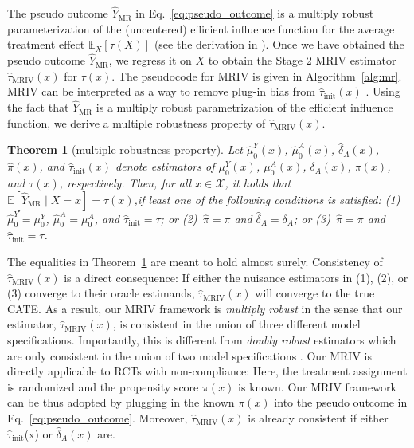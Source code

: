\documentclass{article} %
\newcommand{\E}{\mathbb{E}}
\newcommand{\frameworkname}{MRIV\xspace}
\theoremstyle{definition}
\theoremstyle{plain}
\newtheorem{theorem}{Theorem}
\begin{document}
The pseudo outcome $\hat{Y}_{\mathrm{\mathrm{MR}}}$ in Eq.~\eqref{eq:pseudo_outcome} is a multiply robust parameterization of the (uncentered) efficient influence function for the average treatment effect $\E_X[\tau(X)]$ (see the derivation in \citep{Wang.2018}). %
Once we have obtained the pseudo outcome $\hat{Y}_{\mathrm{\mathrm{MR}}}$, we regress it on $X$ to obtain the Stage 2 \frameworkname estimator $\hat{\tau}_{\mathrm{\frameworkname}}(x)$ for $\tau(x)$. The pseudocode for \frameworkname is given in Algorithm~\ref{alg:mr}. \frameworkname can be interpreted as a way to remove plug-in bias from $\hat{\tau}_{\mathrm{init}}(x)$ \citep{Curth.2020}. Using the fact that $\hat{Y}_{\mathrm{\mathrm{MR}}}$ is a multiply robust parametrization of the efficient influence function, we derive a multiple robustness property of $\hat{\tau}_{\mathrm{MRIV}}(x)$.

\begin{theorem}[multiple robustness property]\label{thrm:robustness}
Let $\hat{\mu}_0^Y(x)$, $\hat{\mu}_0^A(x)$, $\hat{\delta}_A(x)$, $\hat{\pi}(x)$, and $\hat{\tau}_{\mathrm{init}}(x)$ denote estimators of $\mu_0^Y(x)$, $\mu_0^A(x)$, $\delta_A(x)$, $\pi(x)$, and $\tau(x)$, respectively. Then, for all $x \in \mathcal{X}$, it holds that $\E[\hat{Y}_{\mathrm{\mathrm{MR}}} \mid X = x] = \tau(x)$,if least one of the following conditions is satisfied: (1)~$\hat{\mu}_0^Y = \mu_0^Y$, $\hat{\mu}_0^A = \mu_0^A$, and $\hat{\tau}_{\mathrm{init}} = \tau$; or (2)~$\hat{\pi} = \pi$ and $\hat{\delta}_A = \delta_A$; or (3)~$\hat{\pi} = \pi$ and $\hat{\tau}_{\mathrm{init}} = \tau$.
\vspace{-0.2cm}
\end{theorem}
The equalities in Theorem~\ref{thrm:robustness} are meant to hold almost surely. Consistency of $\hat{\tau}_{\mathrm{MRIV}}(x)$ is a direct consequence: If either the nuisance estimators in (1), (2), or (3) converge to their oracle estimands, $\hat{\tau}_{\mathrm{MRIV}}(x)$ will converge to the true CATE. As a result, our \frameworkname framework is \emph{multiply robust} in the sense that our estimator, $\hat{\tau}_{\mathrm{MRIV}}(x)$, is consistent in the union of three different model specifications. Importantly, this is different from \emph{doubly robust} estimators which are only consistent in the union of two model specifications \citep{Wang.2018}. Our \frameworkname is directly applicable to RCTs with non-compliance: Here, the treatment assignment is randomized and the propensity score $\pi(x)$ is known. Our \frameworkname framework can be thus adopted by plugging in the known $\pi(x)$ into the pseudo outcome in Eq.~\eqref{eq:pseudo_outcome}. Moreover, $\hat{\tau}_{\mathrm{MRIV}}(x)$ is already consistent if either $\hat{\tau}_{\mathrm{init}}$(x) or $\hat{\delta}_A(x)$ are.
\end{document}
